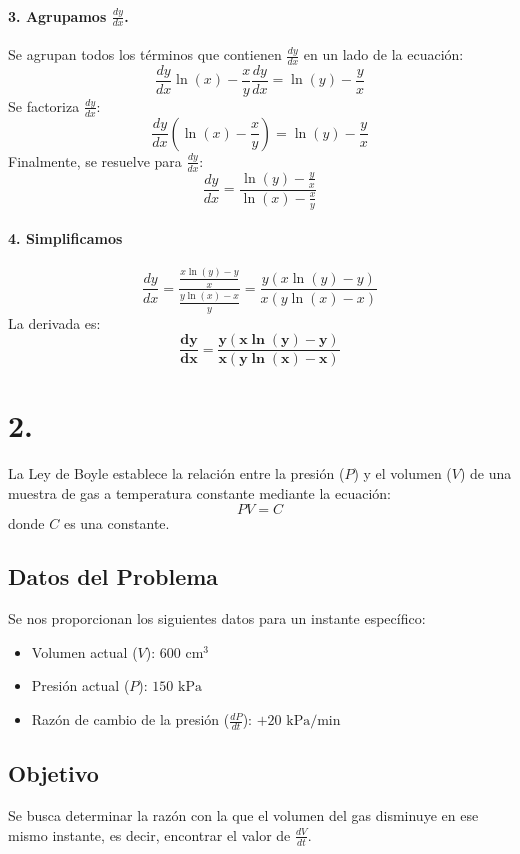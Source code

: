 \documentclass[12pt, letterpaper]{article}
\begin{document}
\paragraph{3. Agrupamos $\frac{dy}{dx}$.}
Se agrupan todos los términos que contienen $\frac{dy}{dx}$ en un lado de la ecuación:
$$
\frac{dy}{dx} \ln(x) - \frac{x}{y} \frac{dy}{dx} = \ln(y) - \frac{y}{x}
$$
Se factoriza $\frac{dy}{dx}$:
$$
\frac{dy}{dx} \left( \ln(x) - \frac{x}{y} \right) = \ln(y) - \frac{y}{x}
$$
Finalmente, se resuelve para $\frac{dy}{dx}$:
$$
\frac{dy}{dx} = \frac{\ln(y) - \frac{y}{x}}{\ln(x) - \frac{x}{y}}
$$

\paragraph{4. Simplificamos}

$$
\frac{dy}{dx} = \frac{\frac{x\ln(y) - y}{x}}{\frac{y\ln(x) - x}{y}} = \frac{y(x\ln(y) - y)}{x(y\ln(x) - x)}
$$
La derivada es:
$$
\mathbf{\frac{dy}{dx} = \frac{y(x\ln(y) - y)}{x(y\ln(x) - x)}}
$$

\section*{2.}

La Ley de Boyle establece la relación entre la presión ($P$) y el volumen ($V$) de una muestra de gas a temperatura constante mediante la ecuación:
$$
PV = C
$$
donde $C$ es una constante.

\subsection*{Datos del Problema}
Se nos proporcionan los siguientes datos para un instante específico:
\begin{itemize}
    \item Volumen actual ($V$): $600 \text{ cm}^3$
    \item Presión actual ($P$): $150 \text{ kPa}$
    \item Razón de cambio de la presión ($\frac{dP}{dt}$): $+20 \text{ kPa/min}$ 
\end{itemize}

\subsection*{Objetivo}
Se busca determinar la razón con la que el volumen del gas disminuye en ese mismo instante, es decir, encontrar el valor de $\frac{dV}{dt}$.
\end{document}
